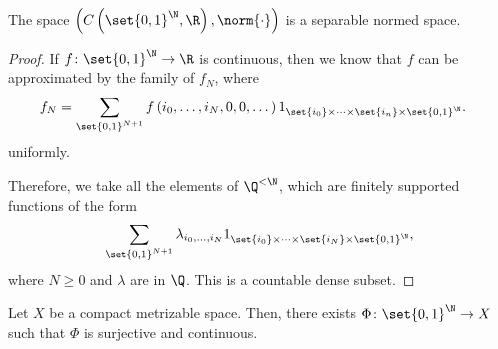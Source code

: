 \documentclass[10pt]{mypackage}
\begin{document}
\begin{proposition}
  The space $\left( C\left( \set{0,1}^{\N},\R \right),\norm{\cdot} \right)$ is a separable normed space.
\end{proposition}
\begin{proof}
  If $f\colon \set{0,1}^{\N}\to \R$ is continuous, then we know that $f$ can be approximated by the family of $f_N$, where
  \begin{align*}
    f_N &= \sum_{\set{0,1}^{N+1}} f\left( i_0,\dots,i_N,0,0,\dots \right)1_{\set{i_0}\times\cdots\times\set{i_n}\times \set{0,1}^{\N}}.
  \end{align*}
  uniformly.

  Therefore, we take all the elements of $\Q^{<\N}$, which are finitely supported functions of the form
  \begin{align*}
    \sum_{\set{0,1}^{N+1}}\lambda_{i_0,\dots,i_{N}} 1_{\set{i_0}\times\cdots\times\set{i_N}\times\set{0,1}^{\N}},
  \end{align*}
  where $N\geq 0$ and $\lambda$ are in $\Q$. This is a countable dense subset.
\end{proof}
\begin{theorem}
  Let $X$ be a compact metrizable space. Then, there exists $\Phi\colon \set{0,1}^{\N}\to X$ such that $\Phi$ is surjective and continuous.
\end{theorem}
\end{document}
